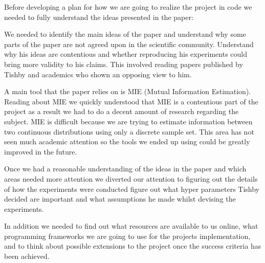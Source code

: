 Before developing a plan for how we are going to realize the project in code we
needed to fully understand the ideas presented in the paper:
\begin{itemize}
    \begin{item}
      We needed to identify the main ideas of the paper and understand why some
      parts of the paper are not agreed upon in the scientific community.
      Understand why his ideas are contentious and whether reproducing his
      experiments could bring more validity to his claims. This involved reading
      papers published by Tishby and academics who shown an opposing view to
      him.
    \end{item}
    \begin{item}
      A main tool that the paper relies on is MIE (Mutual Information
      Estimation). Reading about MIE we quickly understood that MIE is a
      contentious part of the project as a result we had to do a decent amount
      of research regarding the subject. MIE is difficult because we are trying
      to estimate information between two continuous distributions using only a
      discrete sample set. This area has not seen much academic attention so the
      tools we ended up using could be greatly improved in the future.
    \end{item}
\end{itemize}

Once we had a reasonable understanding of the ideas in the paper and which areas
needed more attention we diverted our attention to figuring out the details of
how the experiments were conducted figure out what hyper parameters Tishby
decided are important and what assumptions he made whilst devising the
experiments. 

In addition we needed to find out what resources are available to us online,
what programming frameworks we are going to use for the projects implementation,
and to think about possible extensions to the project once the success criteria
has been achieved.

